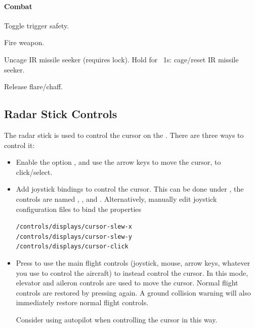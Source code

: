 \documentclass[a4paper]{report}
\begin{document}
\paragraph{Combat}
\begin{description}
  \item[\keys{\shift+E}] Toggle trigger safety.
  \item[\keys{E}] Fire weapon.
  \item[\keys{\shift+U}] Uncage IR missile seeker (requires lock). Hold for ~1s: cage/reset IR missile seeker.
  \item[\keys{Q}] Release flare/chaff.
\end{description}

\subsection{Radar Stick Controls}
\label{sec:cursor}
The radar stick is used to control the cursor on the .
There are three ways to control it:
\begin{itemize}
  \item Enable the option ,
    and use the arrow keys to move the cursor, \keys{\return} to click/select.
  \item Add joystick bindings to control the cursor.
    This can be done under ,
    the controls are named , , and .
    Alternatively, manually edit joystick configuration files to bind the properties
    \begin{alltt}
/controls/displays/cursor-slew-x
/controls/displays/cursor-slew-y
/controls/displays/cursor-click\end{alltt}
  \item Press  to use the main flight controls
    (joystick, mouse, arrow keys, whatever you use to control the aircraft)
    to instead control the cursor.
    In this mode, elevator and aileron controls are used to move the cursor.
    Normal flight controls are restored by pressing  again.
    A ground collision warning will also immediately restore normal flight controls.

    Consider using autopilot when controlling the cursor in this way.
\end{itemize}
\end{document}
